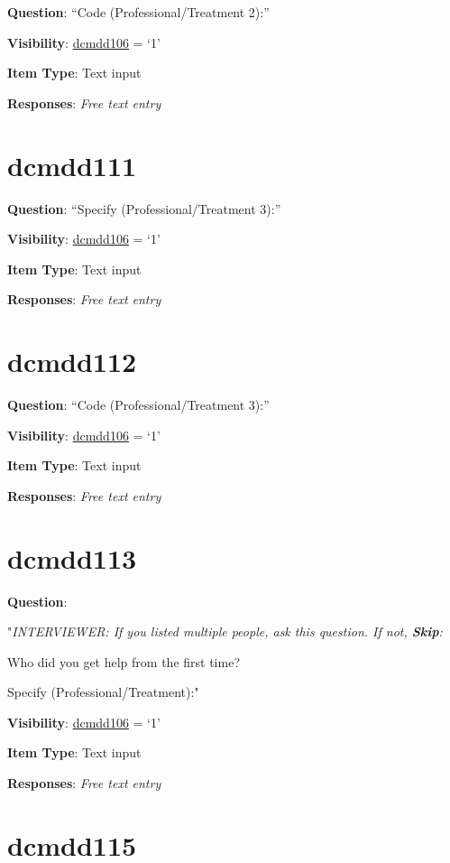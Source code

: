 \documentclass[]{book}
\begin{document}
\textbf{Question}: ``Code (Professional/Treatment 2):''

\textbf{Visibility}: \protect\hyperlink{dcmdd106}{dcmdd106} = `1'

\textbf{Item Type}: Text input

\textbf{Responses}: \emph{Free text entry}

\hypertarget{dcmdd111}{%
\section{dcmdd111}\label{dcmdd111}}

\textbf{Question}: ``Specify (Professional/Treatment 3):''

\textbf{Visibility}: \protect\hyperlink{dcmdd106}{dcmdd106} = `1'

\textbf{Item Type}: Text input

\textbf{Responses}: \emph{Free text entry}

\hypertarget{dcmdd112}{%
\section{dcmdd112}\label{dcmdd112}}

\textbf{Question}: ``Code (Professional/Treatment 3):''

\textbf{Visibility}: \protect\hyperlink{dcmdd106}{dcmdd106} = `1'

\textbf{Item Type}: Text input

\textbf{Responses}: \emph{Free text entry}

\hypertarget{dcmdd113}{%
\section{dcmdd113}\label{dcmdd113}}

\textbf{Question}:

"\emph{INTERVIEWER: If you listed multiple people, ask this question. If not, \textbf{Skip}:}

Who did you get help from the first time?

Specify (Professional/Treatment):"

\textbf{Visibility}: \protect\hyperlink{dcmdd106}{dcmdd106} = `1'

\textbf{Item Type}: Text input

\textbf{Responses}: \emph{Free text entry}

\hypertarget{dcmdd115}{%
\section{dcmdd115}\label{dcmdd115}}
\end{document}
